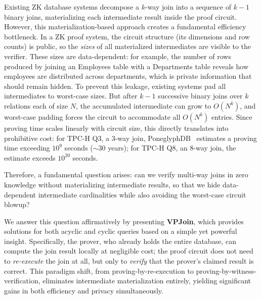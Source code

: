 \documentclass[sigconf]{acmart}
\renewcommand{\emph}[1]{\textit{#1}}
\begin{document}
Existing ZK database systems decompose a $k$-way join into a sequence of $k{-}1$ binary joins, materializing each intermediate result inside the proof circuit. However, this materialization-based approach creates a fundamental efficiency bottleneck. In a ZK proof system, the circuit structure (its dimensions and row counts) is public, so the \emph{sizes} of all materialized intermediates are visible to the verifier. These sizes are data-dependent: for example, the number of rows produced by joining an \textsf{Employees} table with a \textsf{Departments} table reveals how employees are distributed across departments, which is private information that should remain hidden. To prevent this leakage, existing systems pad all intermediates to worst-case sizes. But after $k{-}1$ successive binary joins over $k$ relations each of size $N$, the accumulated intermediate can grow to $O(N^k)$, and worst-case padding forces the circuit to accommodate all $O(N^k)$ entries. Since proving time scales linearly with circuit size, this directly translates into prohibitive cost: for TPC-H Q3, a $3$-way join, PoneglyphDB~\cite{gu2025poneglyphdb} estimates a proving time exceeding $10^{9}$ seconds (${\sim}30$ years); for TPC-H Q8, an $8$-way join, the estimate exceeds $10^{20}$ seconds.

Therefore, a fundamental question arises: can we verify multi-way joins in zero knowledge without materializing intermediate results, so that we hide data-dependent intermediate cardinalities while also avoiding the worst-case circuit blowup?

We answer this question affirmatively by presenting \textbf{VPJoin}, which provides solutions for both acyclic and cyclic queries based on a simple yet powerful insight. Specifically, the prover, who already holds the entire database, can compute the join result locally at negligible cost; the proof circuit does not need to \emph{re-execute} the join at all, but only to \emph{verify} that the prover's claimed result is correct. This paradigm shift, from proving-by-re-execution to proving-by-witness-verification, eliminates intermediate materialization entirely, yielding significant gains in both efficiency and privacy simultaneously.
\end{document}
